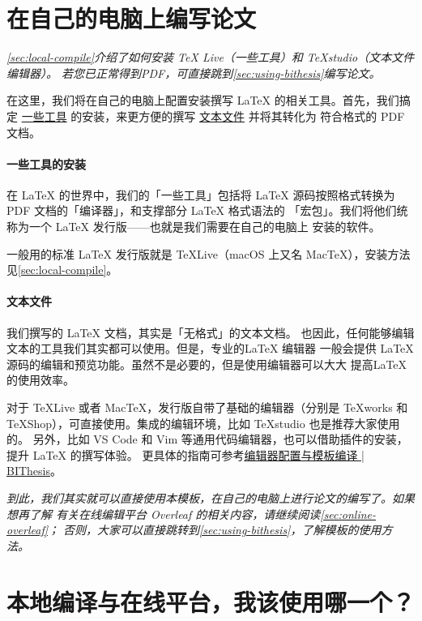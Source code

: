 \section{在自己的电脑上编写论文}

\textit{
\autoref{sec:local-compile}介绍了如何安装 TeX Live（一些工具）和 TeXstudio（文本文件编辑器）。
若您已正常得到PDF，可直接跳到\autoref{sec:using-bithesis}编写论文。
}

在这里，我们将在自己的电脑上配置安装撰写 \LaTeX{} 的相关工具。首先，我们搞定
\underline{一些工具} 的安装，来更方便的撰写 \underline{文本文件} 并将其转化为
符合格式的 PDF 文档。

\paragraph{一些工具的安装} 在 \LaTeX{} 的世界中，我们的「一些工具」包括将
\LaTeX{} 源码按照格式转换为 PDF 文档的「编译器」，和支撑部分 \LaTeX{} 格式语法的
「宏包」。我们将他们统称为一个 \LaTeX{} 发行版——也就是我们需要在自己的电脑上
安装的软件。

一般用的标准 \LaTeX{} 发行版就是 \TeX{}Live（macOS 上又名 Mac\TeX{}），安装方法见\autoref{sec:local-compile}。

\paragraph{文本文件} 我们撰写的 \LaTeX{} 文档，其实是「无格式」的文本文档。
也因此，任何能够编辑文本的工具我们其实都可以使用。但是，专业的\LaTeX{} 编辑器
一般会提供 \LaTeX{} 源码的编辑和预览功能。虽然不是必要的，但是使用编辑器可以大大
提高\LaTeX{} 的使用效率。

对于 \TeX{}Live 或者 Mac\TeX，发行版自带了基础的编辑器（分别是 \TeX{}works 和
\TeX{}Shop），可直接使用。集成的编辑环境，比如 \TeX{}studio 也是推荐大家使用的。
另外，比如 VS Code 和 Vim 等通用代码编辑器，也可以借助插件的安装，提升 \LaTeX{}
的撰写体验。
更具体的指南可参考\href{https://bithesis.bitnp.net/guide/configure-and-compile.html}{编辑器配置与模板编译 | BIThesis}。

\textit{
到此，我们其实就可以直接使用本模板，在自己的电脑上进行论文的编写了。如果想再了解
有关在线编辑平台 Overleaf 的相关内容，请继续阅读\autoref{sec:online-overleaf}；
否则，大家可以直接跳转到\autoref{sec:using-bithesis}，了解模板的使用方法。
}

\section{本地编译与在线平台，我该使用哪一个？}
\label{sec:online-overleaf}

